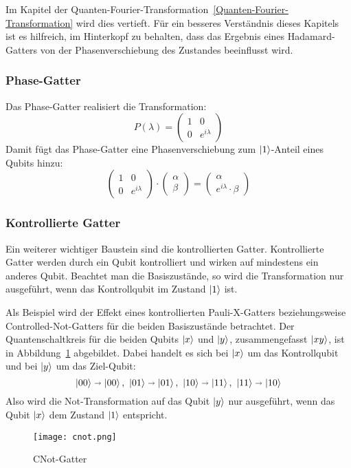 Im Kapitel der Quanten-Fourier-Transformation~\ref{Quanten-Fourier-Transformation} wird dies vertieft.
Für ein besseres Verständnis dieses Kapitels ist es hilfreich, 
im Hinterkopf zu behalten, 
dass das Ergebnis eines Hadamard-Gatters von der Phasenverschiebung des Zustandes beeinflusst wird.


\subsubsection*{Phase-Gatter}
Das Phase-Gatter realisiert die Transformation:
\[
  P(\lambda) =
  \begin{pmatrix}
    1 & 0 \\
    0 & e^{i\lambda}
    \end{pmatrix}
  \]
Damit fügt das Phase-Gatter eine Phasenverschiebung zum \(\ket{1}\)-Anteil eines Qubits hinzu:
\[
  \begin{pmatrix}
    1 & 0 \\
    0 & e^{i\lambda}
    \end{pmatrix}
    \cdot
    \begin{pmatrix}
      \alpha \\
      \beta
    \end{pmatrix}
      =
    \begin{pmatrix}
      \alpha \\
      e^{i\lambda} \cdot \beta
    \end{pmatrix}
\]


\subsubsection*{Kontrollierte Gatter}
Ein weiterer wichtiger Baustein sind die kontrollierten Gatter. 
Kontrollierte Gatter werden durch ein Qubit kontrolliert und wirken auf mindestens ein anderes Qubit. 
Beachtet man die Basiszustände, 
so wird die Transformation nur ausgeführt, 
wenn das Kontrollqubit im Zustand \(\ket{1}\) ist.

Als Beispiel wird der Effekt eines kontrollierten Pauli-X-Gatters beziehungsweise 
Controlled-Not-Gatters für die beiden Basiszustände betrachtet.
Der Quantenschaltkreis für die beiden Qubits \(\ket{x}\) und \(\ket{y}\), zusammengefasst \(\ket{xy}\), 
ist in Abbildung~\ref{fig:cnot} abgebildet.
Dabei handelt es sich bei \(\ket{x}\) um das Kontrollqubit und bei \(\ket{y}\) um das Ziel-Qubit:
\[\ket{00}\shortrightarrow\ket{00},~\ket{01}\shortrightarrow\ket{01},~
\ket{10}\shortrightarrow\ket{11},~\ket{11}\shortrightarrow\ket{10}
  \]
Also wird die Not-Transformation auf das Qubit \(\ket{y}\) nur ausgeführt, 
wenn das Qubit \(\ket{x}\) dem Zustand \(\ket{1}\) entspricht.
\begin{figure}[H]
  \centering
  \texttt{[image: cnot.png]}
  \caption{CNot-Gatter}
  \label{fig:cnot}
\end{figure}

